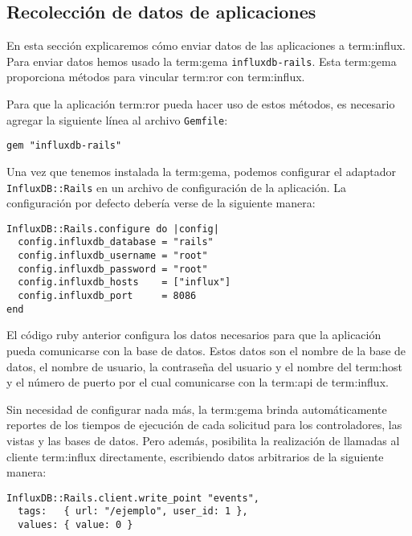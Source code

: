 \subsection{Recolección de datos de aplicaciones}
\label{aplicaciones}

En  esta sección explicaremos cómo enviar datos de las aplicaciones  a
\gls{term:influx}. Para enviar datos hemos usado la \gls{term:gema}
\texttt{influxdb-rails}. Esta \gls{term:gema} proporciona métodos para vincular
\gls{term:ror} con \gls{term:influx}.

Para que la aplicación \gls{term:ror} pueda hacer uso de estos métodos, es
necesario agregar la siguiente línea al archivo \texttt{Gemfile}:

\begin{lstlisting}
gem "influxdb-rails"
\end{lstlisting}

Una vez que tenemos instalada la \gls{term:gema}, podemos configurar el
adaptador \texttt{InfluxDB::Rails} en un archivo de configuración de la
aplicación. La configuración por defecto debería verse de la siguiente manera:

\begin{lstlisting}
InfluxDB::Rails.configure do |config|
  config.influxdb_database = "rails"
  config.influxdb_username = "root"
  config.influxdb_password = "root"
  config.influxdb_hosts    = ["influx"]
  config.influxdb_port     = 8086
end
\end{lstlisting}

El código ruby anterior configura los datos necesarios para que la aplicación
pueda comunicarse con la base de datos. Estos datos son el nombre de la base de
datos, el nombre de usuario, la contraseña del usuario y el nombre del
\gls{term:host} y el número de puerto por el cual comunicarse con la
\gls{term:api} de \gls{term:influx}.

Sin necesidad de configurar nada más, la \gls{term:gema} brinda automáticamente
reportes de los tiempos de ejecución de cada solicitud  para los
controladores, las vistas y las bases de datos. Pero además, posibilita la
realización de llamadas al cliente \gls{term:influx} directamente, escribiendo
datos arbitrarios de la siguiente manera:

\begin{lstlisting}
InfluxDB::Rails.client.write_point "events",
  tags:   { url: "/ejemplo", user_id: 1 },
  values: { value: 0 }
\end{lstlisting}

